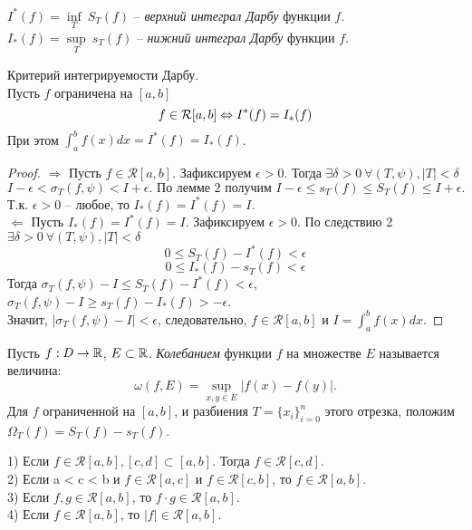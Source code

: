     \begin{definition} \ \\
        $I^{*}(f) = \underset{T}{\inf} \ S_{T}(f)$ -- \textit{верхний интеграл Дарбу} функции $f$.\\
        $I_{*}(f) = \underset{T}{\sup} \ s_{T}(f)$ -- \textit{нижний интеграл Дарбу} функции $f$.
    \end{definition}

    \begin{theorem}{Критерий интегрируемости Дарбу.}\\
        Пусть $f$ ограничена на $[a, b]$
        \[f \in \mathcal{R}[a, b] \Leftrightarrow I^{*}(f) = I_{*}(f)\]
        При этом $\int_{a}^{b} f(x) dx = I^{*}(f) = I_{*}(f)$.
    \end{theorem}
    
    \begin{proof}
        $\Rightarrow$ Пусть $f \in \mathcal{R}[a, b]$. Зафиксируем $\epsilon > 0$. Тогда $\exists \delta > 0 \ \forall(T, \psi), |T| < \delta$
        \[I - \epsilon < \sigma_{T}(f, \psi) < I + \epsilon. \text{ По лемме 2 получим } I - \epsilon \leq s_{T}(f) \leq S_{T}(f) \leq I + \epsilon.\]
        Т.к. $\epsilon > 0$ -- любое, то $I_{*}(f) = I^{*}(f) = I$.\\
        $\Leftarrow$ Пусть  $I_{*}(f) = I^{*}(f) = I$. Зафиксируем $\epsilon > 0$. По следствию 2 $\exists \delta > 0 \ \forall(T, \psi), |T| < \delta$
        \[0 \leq S_{T}(f) - I^{*}(f) < \epsilon\]
        \[0 \leq I_{*}(f) - s_{T}(f) < \epsilon\]
        Тогда $\sigma_{T}(f, \psi) - I \leq S_{T}(f) - I^{*}(f) < \epsilon$, 
        $\sigma_{T}(f, \psi) - I \geq s_{T}(f) - I_{*}(f) > -\epsilon$.\\
        Значит, $|\sigma_{T}(f, \psi) - I| < \epsilon$, следовательно, $f \in \mathcal{R}[a, b]$ и $I = \int_{a}^{b}f(x)dx$.
    \end{proof}

    \begin{definition}
        Пусть $f: D \to \mathbb{R}$, $E \subset \mathbb{R}$. \textit{Колебанием} функции $f$ на множестве $E$ называется величина:
        \[\omega(f, E) = \sup_{x, y \in E}|f(x) - f(y)|.\]
        Для $f$ ограниченной на $[a, b]$, и разбиения $T = \{x_{i}\}_{i = 0}^{n}$ этого отрезка, положим $\Omega_{T}(f) = S_{T}(f) - s_{T}(f)$.
    \end{definition}

    \begin{theorem}
        \hypertarget{punkt_2}{\item}
        1) Если $f \in \mathcal{R}[a, b], [c, d] \subset [a, b]$. Тогда $f \in \mathcal{R}[c, d]$.\\
        2) Если a < c < b и $f \in \mathcal{R}[a, c]$ и $f \in \mathcal{R}[c, b]$, то $f \in \mathcal{R}[a, b]$.\\
        3) Если $f, g \in \mathcal{R}[a, b]$, то $f \cdot g \in \mathcal{R}[a, b]$.\\
        4) Если $f \in \mathcal{R}[a, b]$, то $|f| \in \mathcal{R}[a, b]$.
    \end{theorem}
    
